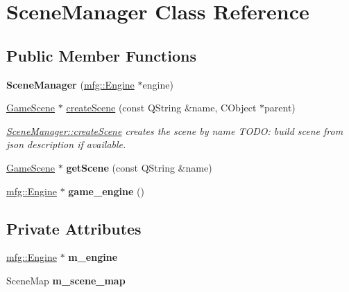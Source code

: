 \hypertarget{class_scene_manager}{}\section{Scene\+Manager Class Reference}
\label{class_scene_manager}
\subsection*{Public Member Functions}
\begin{DoxyCompactItemize}
\item 
\mbox{\label{class_scene_manager_a017968ad7fea883b37597ccd43ee8d21}} 
{\bfseries Scene\+Manager} (\hyperlink{classmfg_1_1_engine}{mfg\+::\+Engine} $\ast$engine)
\item 
\hyperlink{class_game_scene}{Game\+Scene} $\ast$ \hyperlink{class_scene_manager_ac862660ed44b8ab110dec97ec90a9bad}{create\+Scene} (const Q\+String \&name, C\+Object $\ast$parent)
\begin{DoxyCompactList}\small\item\em \hyperlink{class_scene_manager_ac862660ed44b8ab110dec97ec90a9bad}{Scene\+Manager\+::create\+Scene} creates the scene by name T\+O\+DO\+: build scene from json description if available. \end{DoxyCompactList}\item 
\mbox{\label{class_scene_manager_a1f8394061bc73982c2893bb4984f4542}} 
\hyperlink{class_game_scene}{Game\+Scene} $\ast$ {\bfseries get\+Scene} (const Q\+String \&name)
\item 
\mbox{\label{class_scene_manager_a249162f1c24a0960e354a67cf9ed039d}} 
\hyperlink{classmfg_1_1_engine}{mfg\+::\+Engine} $\ast$ {\bfseries game\+\_\+engine} ()
\end{DoxyCompactItemize}
\subsection*{Private Attributes}
\begin{DoxyCompactItemize}
\item 
\mbox{\label{class_scene_manager_a487426cfd98ef3b57a7b0192d490b4ae}} 
\hyperlink{classmfg_1_1_engine}{mfg\+::\+Engine} $\ast$ {\bfseries m\+\_\+engine}
\item 
\mbox{\label{class_scene_manager_a84a59de256b2d0c2574d77c62b0f4ff3}} 
Scene\+Map {\bfseries m\+\_\+scene\+\_\+map}
\end{DoxyCompactItemize}



